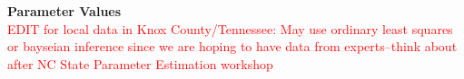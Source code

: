 \documentclass[12pt]{article}
\begin{document}
\vspace{-2cm}

 \textbf{Parameter Values} \\

\textcolor{red}{EDIT for local data in Knox County/Tennessee: May use ordinary least squares or bayseian inference since we are hoping to have data from experts--think about after NC State Parameter Estimation workshop} \\ 
\end{document}
